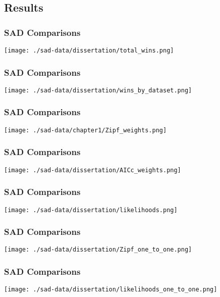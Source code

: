 \documentclass[14pt]{beamer}
\begin{document}


\subsection{Results}
\begin{frame}{}
\frametitle{SAD Comparisons}
\texttt{[image: ./sad-data/dissertation/total\_wins.png]}
\end{frame}

\begin{frame}{}
\frametitle{SAD Comparisons}
\texttt{[image: ./sad-data/dissertation/wins\_by\_dataset.png]}
\end{frame}

\begin{frame}{}
\frametitle{SAD Comparisons}
\texttt{[image: ./sad-data/chapter1/Zipf\_weights.png]}
\end{frame}


\begin{frame}{}
\frametitle{SAD Comparisons}
\texttt{[image: ./sad-data/dissertation/AICc\_weights.png]}
\end{frame}

\begin{frame}{}
\frametitle{SAD Comparisons}
\texttt{[image: ./sad-data/dissertation/likelihoods.png]}
\end{frame}

\begin{frame}{}
\frametitle{SAD Comparisons}
\texttt{[image: ./sad-data/dissertation/Zipf\_one\_to\_one.png]}
\end{frame}

\begin{frame}{}
\frametitle{SAD Comparisons}
\texttt{[image: ./sad-data/dissertation/likelihoods\_one\_to\_one.png]}
\end{frame}
\end{document}
